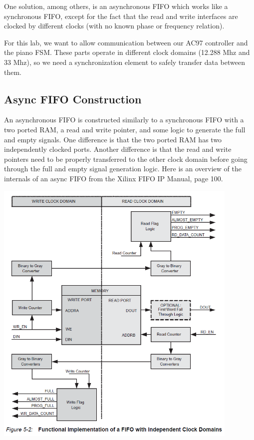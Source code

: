 \documentclass[11pt]{article}
\begin{document}
One solution, among others, is an asynchronous FIFO which works like a synchronous FIFO, except for the fact that the read and write interfaces are clocked by different clocks (with no known phase or frequency relation).

For this lab, we want to allow communication between our AC97 controller and the piano FSM. These parts operate in different clock domains (12.288 Mhz and 33 Mhz), so we need a synchronization element to safely transfer data between them.

\subsection{Async FIFO Construction}
An asynchronous FIFO is constructed similarly to a synchronous FIFO with a two ported RAM, a read and write pointer, and some logic to generate the full and empty signals. One difference is that the two ported RAM has two independently clocked ports. Another difference is that the read and write pointers need to be properly transferred to the other clock domain before going through the full and empty signal generation logic. Here is an overview of the internals of an async FIFO from the Xilinx FIFO IP Manual, page 100.

\begin{center}
	\includegraphics[height=13cm]{async_fifo_diagram.png}
\end{center}
\end{document}
